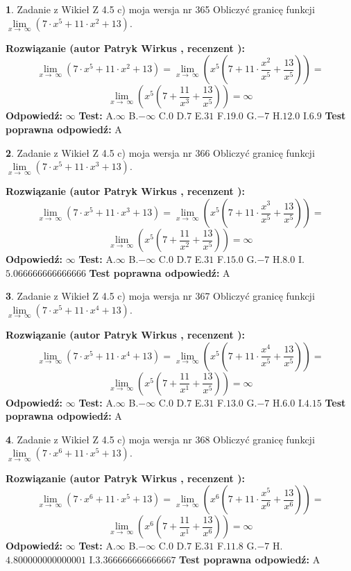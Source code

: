 \documentclass[12pt, a4paper]{article}
\theoremstyle{definition} %
\newtheorem{zad}{}
\newcommand{\zadStart}[1]{\begin{zad}#1\newline}
\newcommand{\zadStop}{\end{zad}}
\newcommand{\rozwStart}[2]{\noindent \textbf{Rozwiązanie (autor #1 , recenzent #2): }\newline}
\newcommand{\rozwStop}{\newline}
\newcommand{\odpStart}{\noindent \textbf{Odpowiedź:}\newline}
\newcommand{\odpStop}{\newline}
\newcommand{\testStart}{\noindent \textbf{Test:}\newline}
\newcommand{\testStop}{\newline}
\newcommand{\kluczStart}{\noindent \textbf{Test poprawna odpowiedź:}\newline}
\newcommand{\kluczStop}{\newline}
\begin{document}
\zadStart{Zadanie z Wikieł Z 4.5 c) moja wersja nr 365}
Obliczyć granicę funkcji  $\lim\limits_{x\to\ \infty}(7 \cdot x^{5}+11 \cdot x^{2}+13)$.
\zadStop
\rozwStart{Patryk Wirkus}{}
$$\lim\limits_{x\to\ \infty}(7 \cdot x^{5}+11 \cdot x^{2}+13) = \lim\limits_{x\to\ \infty}(x^{5}(7 +11 \cdot \frac{x^{2}}{x^{5}}+\frac{13}{x^{5}})) =$$ $$\lim\limits_{x\to\ \infty}(x^{5}(7 +\frac{11}{x^{3}}+\frac{13}{x^{5}})) =\infty$$
\rozwStop
\odpStart
$\infty$
\odpStop
\testStart
A.$\infty$ B.$-\infty$ C.$0$ D.$7$ E.$31$
F.$19.0$ G.$-7$
H.$12.0$
I.$6.9$
\testStop
\kluczStart
A
\kluczStop



\zadStart{Zadanie z Wikieł Z 4.5 c) moja wersja nr 366}
Obliczyć granicę funkcji  $\lim\limits_{x\to\ \infty}(7 \cdot x^{5}+11 \cdot x^{3}+13)$.
\zadStop
\rozwStart{Patryk Wirkus}{}
$$\lim\limits_{x\to\ \infty}(7 \cdot x^{5}+11 \cdot x^{3}+13) = \lim\limits_{x\to\ \infty}(x^{5}(7 +11 \cdot \frac{x^{3}}{x^{5}}+\frac{13}{x^{5}})) =$$ $$\lim\limits_{x\to\ \infty}(x^{5}(7 +\frac{11}{x^{2}}+\frac{13}{x^{5}})) =\infty$$
\rozwStop
\odpStart
$\infty$
\odpStop
\testStart
A.$\infty$ B.$-\infty$ C.$0$ D.$7$ E.$31$
F.$15.0$ G.$-7$
H.$8.0$
I.$5.066666666666666$
\testStop
\kluczStart
A
\kluczStop



\zadStart{Zadanie z Wikieł Z 4.5 c) moja wersja nr 367}
Obliczyć granicę funkcji  $\lim\limits_{x\to\ \infty}(7 \cdot x^{5}+11 \cdot x^{4}+13)$.
\zadStop
\rozwStart{Patryk Wirkus}{}
$$\lim\limits_{x\to\ \infty}(7 \cdot x^{5}+11 \cdot x^{4}+13) = \lim\limits_{x\to\ \infty}(x^{5}(7 +11 \cdot \frac{x^{4}}{x^{5}}+\frac{13}{x^{5}})) =$$ $$\lim\limits_{x\to\ \infty}(x^{5}(7 +\frac{11}{x^{1}}+\frac{13}{x^{5}})) =\infty$$
\rozwStop
\odpStart
$\infty$
\odpStop
\testStart
A.$\infty$ B.$-\infty$ C.$0$ D.$7$ E.$31$
F.$13.0$ G.$-7$
H.$6.0$
I.$4.15$
\testStop
\kluczStart
A
\kluczStop



\zadStart{Zadanie z Wikieł Z 4.5 c) moja wersja nr 368}
Obliczyć granicę funkcji  $\lim\limits_{x\to\ \infty}(7 \cdot x^{6}+11 \cdot x^{5}+13)$.
\zadStop
\rozwStart{Patryk Wirkus}{}
$$\lim\limits_{x\to\ \infty}(7 \cdot x^{6}+11 \cdot x^{5}+13) = \lim\limits_{x\to\ \infty}(x^{6}(7 +11 \cdot \frac{x^{5}}{x^{6}}+\frac{13}{x^{6}})) =$$ $$\lim\limits_{x\to\ \infty}(x^{6}(7 +\frac{11}{x^{1}}+\frac{13}{x^{6}})) =\infty$$
\rozwStop
\odpStart
$\infty$
\odpStop
\testStart
A.$\infty$ B.$-\infty$ C.$0$ D.$7$ E.$31$
F.$11.8$ G.$-7$
H.$4.800000000000001$
I.$3.366666666666667$
\testStop
\kluczStart
A
\kluczStop
\end{document}
